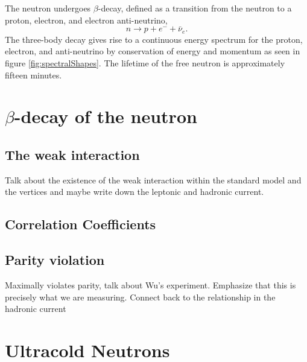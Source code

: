 The neutron undergoes $\beta$-decay, defined as a transition from the neutron
to a proton, electron, and electron anti-neutrino,
\begin{equation*}
  n\rightarrow p + e^- + \bar{\nu}_{e}.
\end{equation*}
\noindent The three-body decay gives rise to a continuous energy spectrum
for the proton, electron, and anti-neutrino by conservation of energy and momentum
as seen in figure \ref{fig:spectralShapes}. The lifetime of the free neutron is
approximately fifteen minutes. 


\section{$\beta$-decay of the neutron}

\subsection{The weak interaction}
Talk about the existence of the weak interaction within the standard model and
the vertices and maybe write down the leptonic and hadronic current.

\subsection{Correlation Coefficients}
\subsection{Parity violation}
Maximally violates parity, talk about Wu's experiment. Emphasize that this is
precisely what we are measuring. Connect back to the relationship in the hadronic
current

\section{Ultracold Neutrons}



